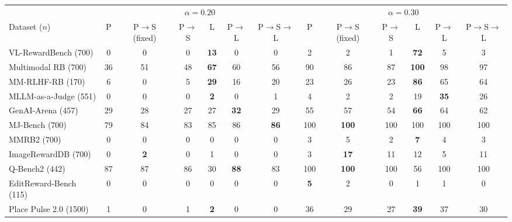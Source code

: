 \begin{tabular}{l|cccccc|cccccc}
\toprule
 & \multicolumn{6}{c}{$\alpha=0.20$} & \multicolumn{6}{c}{$\alpha=0.30$}\\
Dataset ($n$) & P & P$\to$S (fixed) & P$\to$S & L & P$\to$L & P$\to$S$\to$L & P & P$\to$S (fixed) & P$\to$S & L & P$\to$L & P$\to$S$\to$L\\
\midrule
VL-RewardBench (700) & 0 & 0 & 0 & \textbf{13} & 0 & 0 & 2 & 2 & 1 & \textbf{72} & 5 & 3\\
Multimodal RB (700) & 36 & 51 & 48 & \textbf{67} & 60 & 56 & 90 & 86 & 87 & \textbf{100} & 98 & 97\\
MM-RLHF-RB (170) & 6 & 0 & 5 & \textbf{29} & 16 & 20 & 23 & 26 & 23 & \textbf{86} & 65 & 64\\
MLLM-as-a-Judge (551) & 0 & 0 & 0 & \textbf{2} & 0 & 1 & 4 & 2 & 2 & 19 & \textbf{35} & 26\\
GenAI-Arena (457) & 29 & 28 & 27 & 27 & \textbf{32} & 29 & 55 & 57 & 54 & \textbf{66} & 64 & 62\\
MJ-Bench (700) & 79 & 84 & 83 & 85 & 86 & \textbf{86} & 100 & \textbf{100} & 100 & 100 & 100 & 100\\
MMRB2 (700) & 0 & 0 & 0 & 0 & 0 & 0 & 3 & 5 & 2 & \textbf{7} & 4 & 3\\
ImageRewardDB (700) & 0 & \textbf{2} & 0 & 1 & 0 & 0 & 3 & \textbf{17} & 11 & 12 & 5 & 11\\
Q-Bench2 (442) & 87 & 87 & 86 & 30 & \textbf{88} & 83 & 100 & \textbf{100} & 100 & 56 & 100 & 100\\
EditReward-Bench (115) & 0 & 0 & 0 & 0 & 0 & 0 & \textbf{5} & 2 & 0 & 1 & 1 & 0\\
Place Pulse 2.0 (1500) & 1 & 0 & 1 & \textbf{2} & 0 & 0 & 36 & 29 & 27 & \textbf{39} & 37 & 30\\
\bottomrule
\end{tabular}
